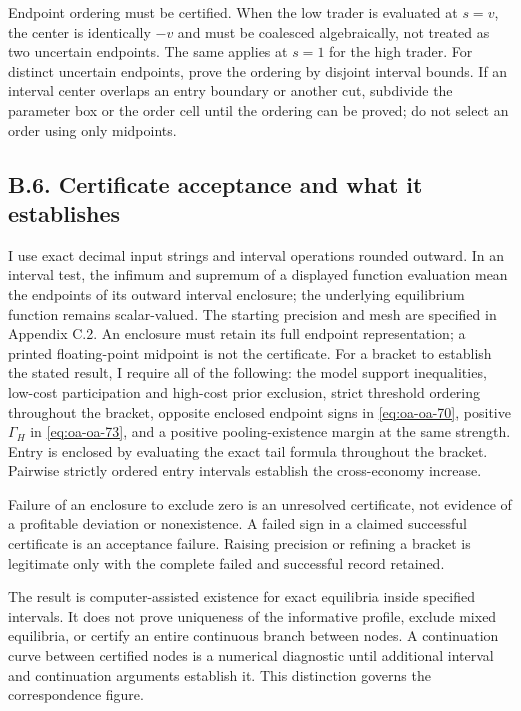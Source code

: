 \documentclass[
  11pt,
]{article}
\newcounter{none} %
\begin{document}
Endpoint ordering must be certified. When the low trader is evaluated at
\(s=v\), the center is identically \(-v\) and must be coalesced
algebraically, not treated as two uncertain endpoints. The same applies
at \(s=1\) for the high trader. For distinct uncertain endpoints, prove
the ordering by disjoint interval bounds. If an interval center overlaps
an entry boundary or another cut, subdivide the parameter box or the
order cell until the ordering can be proved; do not select an order
using only midpoints.

\subsection{B.6. Certificate acceptance and what it
establishes}\label{oa-b-acceptance}

I use exact decimal input strings and interval operations rounded
outward. In an interval test, the infimum and supremum of a displayed
function evaluation mean the endpoints of its outward interval
enclosure; the underlying equilibrium function remains scalar-valued.
The starting precision and mesh are specified in Appendix C.2. An
enclosure must retain its full endpoint representation; a printed
floating-point midpoint is not the certificate. For a bracket to
establish the stated result, I require all of the following: the model
support inequalities, low-cost participation and high-cost prior
exclusion, strict threshold ordering throughout the bracket, opposite
enclosed endpoint signs in \eqref{eq:oa-oa-70}, positive \(\Gamma_H\) in
\eqref{eq:oa-oa-73}, and a positive pooling-existence margin at the same
strength. Entry is enclosed by evaluating the exact tail formula
throughout the bracket. Pairwise strictly ordered entry intervals
establish the cross-economy increase.

Failure of an enclosure to exclude zero is an unresolved certificate,
not evidence of a profitable deviation or nonexistence. A failed sign in
a claimed successful certificate is an acceptance failure. Raising
precision or refining a bracket is legitimate only with the complete
failed and successful record retained.

The result is computer-assisted existence for exact equilibria inside
specified intervals. It does not prove uniqueness of the informative
profile, exclude mixed equilibria, or certify an entire continuous
branch between nodes. A continuation curve between certified nodes is a
numerical diagnostic until additional interval and continuation
arguments establish it. This distinction governs the correspondence
figure.
\end{document}
